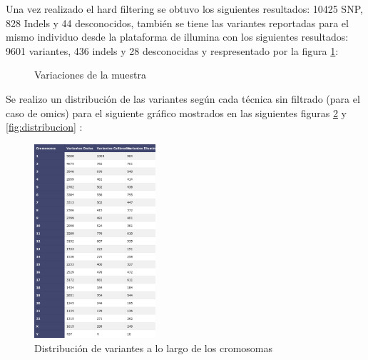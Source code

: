 Una vez realizado el hard filtering se obtuvo los siguientes resultados: 10425 SNP, 828 Indels y 44 desconocidos, también se tiene las variantes reportadas para el mismo individuo desde la plataforma de illumina con los siguientes resultados: 9601 variantes, 436 indels y 28 desconocidas  y respresentado por la figura \ref{f:histogramas}:

\begin{figure}[H]
	\caption{Variaciones de la muestra}
	\label{f:histogramas}
\end{figure}

Se realizo un distribución de las variantes según cada técnica sin filtrado (para el caso de omics) para el siguiente gráfico mostrados en las siguientes figuras  \ref{fig:tabla1} y \ref{fig:distribucion} :

\begin{figure}[H]
	\centering
	\includegraphics[width=0.4\textwidth]{Kap2/latex_table}
	\caption{Distribución de variantes a lo largo de los cromosomas} \label{fig:tabla1}
\end{figure}

